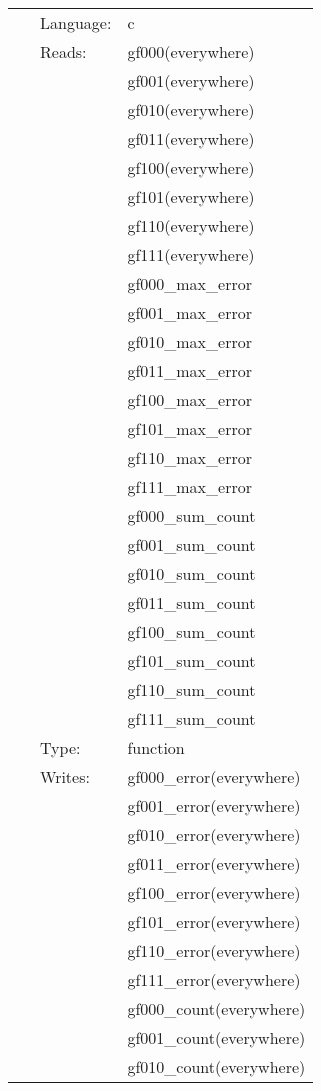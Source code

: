  \begin{tabular*}{160mm}{cll} 
~ & Language:  & c \\ 
~ & Reads:  & gf000(everywhere) \\ 
~& ~ &gf001(everywhere)\\ 
~& ~ &gf010(everywhere)\\ 
~& ~ &gf011(everywhere)\\ 
~& ~ &gf100(everywhere)\\ 
~& ~ &gf101(everywhere)\\ 
~& ~ &gf110(everywhere)\\ 
~& ~ &gf111(everywhere)\\ 
~& ~ &gf000\_max\_error\\ 
~& ~ &gf001\_max\_error\\ 
~& ~ &gf010\_max\_error\\ 
~& ~ &gf011\_max\_error\\ 
~& ~ &gf100\_max\_error\\ 
~& ~ &gf101\_max\_error\\ 
~& ~ &gf110\_max\_error\\ 
~& ~ &gf111\_max\_error\\ 
~& ~ &gf000\_sum\_count\\ 
~& ~ &gf001\_sum\_count\\ 
~& ~ &gf010\_sum\_count\\ 
~& ~ &gf011\_sum\_count\\ 
~& ~ &gf100\_sum\_count\\ 
~& ~ &gf101\_sum\_count\\ 
~& ~ &gf110\_sum\_count\\ 
~& ~ &gf111\_sum\_count\\ 
~ & Type:  & function \\ 
~ & Writes:  & gf000\_error(everywhere) \\ 
~& ~ &gf001\_error(everywhere)\\ 
~& ~ &gf010\_error(everywhere)\\ 
~& ~ &gf011\_error(everywhere)\\ 
~& ~ &gf100\_error(everywhere)\\ 
~& ~ &gf101\_error(everywhere)\\ 
~& ~ &gf110\_error(everywhere)\\ 
~& ~ &gf111\_error(everywhere)\\ 
~& ~ &gf000\_count(everywhere)\\ 
~& ~ &gf001\_count(everywhere)\\ 
~& ~ &gf010\_count(everywhere)\\ 

\end{tabular*}
